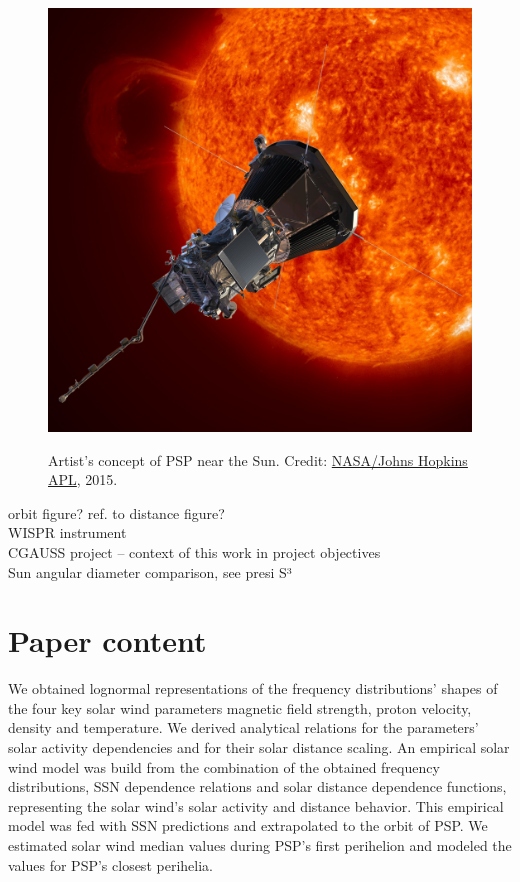 \begin{figure}[htb]
\begin{floatrow}
{			\includegraphics[width=\Xhsize]{figures_of_others/images/SPP_ObservingSun2_square.jpg}
		}{
			\caption{Artist’s concept of PSP near the Sun. Credit: \href{http://parkersolarprobe.jhuapl.edu/Multimedia/Images.php}{NASA/Johns Hopkins APL}, 2015.}
			\label{fig:SPP_ObservingSun2}
		}
		\end{floatrow}
\end{figure}

orbit figure? ref. to distance figure?\\
WISPR instrument\\
CGAUSS project -- context of this work in project objectives\\
Sun angular diameter comparison, see presi S³\\


\section{Paper content}
We obtained lognormal representations of the frequency distributions’ shapes of the four key solar wind parameters magnetic field strength, proton velocity, density and temperature. We derived analytical relations for the parameters’ solar activity dependencies and for their solar distance scaling. An empirical solar wind model was build from the combination of the obtained frequency distributions, SSN dependence relations and solar distance dependence functions, representing the solar wind’s solar activity and distance behavior. This empirical model was fed with SSN predictions and extrapolated to the orbit of PSP. We estimated solar wind median values during PSP’s first perihelion and modeled the values for PSP’s closest perihelia.\\

